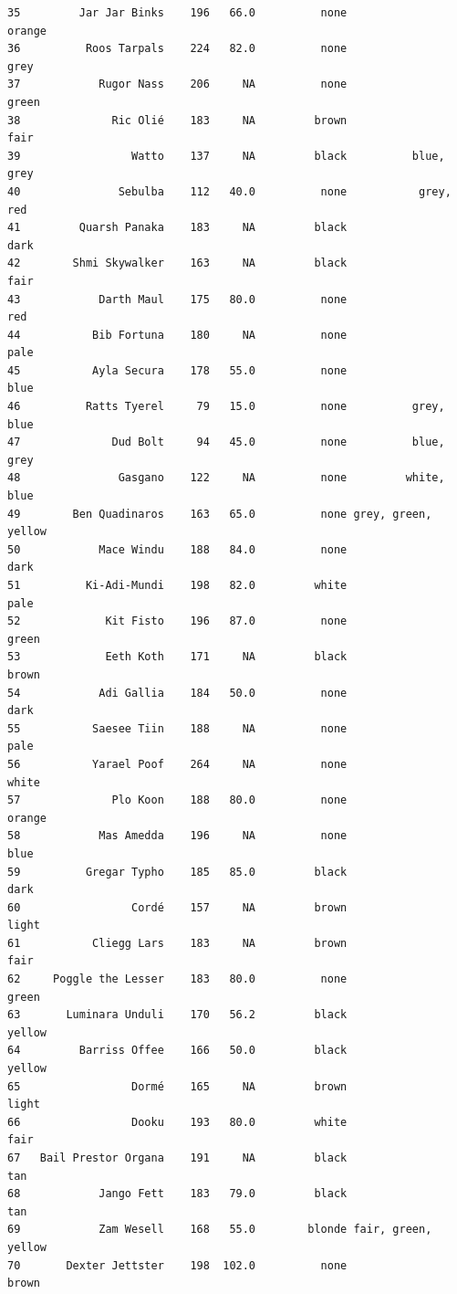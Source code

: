 \documentclass[
]{article}
\begin{document}
\begin{verbatim}
35         Jar Jar Binks    196   66.0          none              orange
36          Roos Tarpals    224   82.0          none                grey
37            Rugor Nass    206     NA          none               green
38              Ric Olié    183     NA         brown                fair
39                 Watto    137     NA         black          blue, grey
40               Sebulba    112   40.0          none           grey, red
41         Quarsh Panaka    183     NA         black                dark
42        Shmi Skywalker    163     NA         black                fair
43            Darth Maul    175   80.0          none                 red
44           Bib Fortuna    180     NA          none                pale
45           Ayla Secura    178   55.0          none                blue
46          Ratts Tyerel     79   15.0          none          grey, blue
47              Dud Bolt     94   45.0          none          blue, grey
48               Gasgano    122     NA          none         white, blue
49        Ben Quadinaros    163   65.0          none grey, green, yellow
50            Mace Windu    188   84.0          none                dark
51          Ki-Adi-Mundi    198   82.0         white                pale
52             Kit Fisto    196   87.0          none               green
53             Eeth Koth    171     NA         black               brown
54            Adi Gallia    184   50.0          none                dark
55           Saesee Tiin    188     NA          none                pale
56           Yarael Poof    264     NA          none               white
57              Plo Koon    188   80.0          none              orange
58            Mas Amedda    196     NA          none                blue
59          Gregar Typho    185   85.0         black                dark
60                 Cordé    157     NA         brown               light
61           Cliegg Lars    183     NA         brown                fair
62     Poggle the Lesser    183   80.0          none               green
63       Luminara Unduli    170   56.2         black              yellow
64         Barriss Offee    166   50.0         black              yellow
65                 Dormé    165     NA         brown               light
66                 Dooku    193   80.0         white                fair
67   Bail Prestor Organa    191     NA         black                 tan
68            Jango Fett    183   79.0         black                 tan
69            Zam Wesell    168   55.0        blonde fair, green, yellow
70       Dexter Jettster    198  102.0          none               brown

\end{verbatim}
\end{document}
